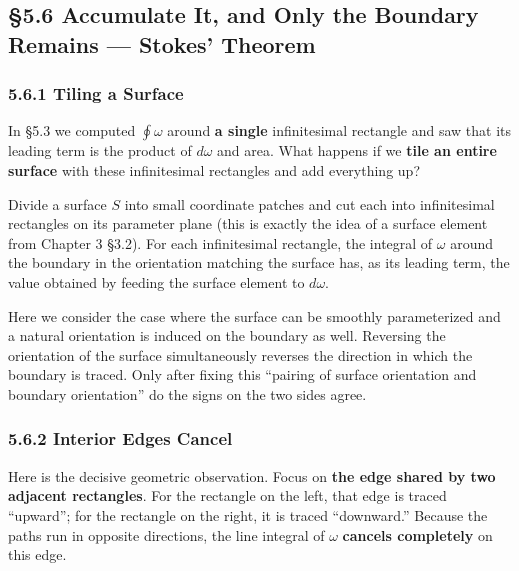 \documentclass[a4paper,12pt,openany]{book}
\begin{document}
\par\vspace{0.35em}\par

\hypertarget{accumulate-it-and-only-the-boundary-remains-stokes-theorem}{%
\subsection{§5.6 Accumulate It, and Only the Boundary Remains —
Stokes'
Theorem}\label{accumulate-it-and-only-the-boundary-remains-stokes-theorem}}

\hypertarget{tiling-a-surface}{%
\subsubsection{5.6.1 Tiling a Surface}\label{tiling-a-surface}}

In §5.3 we computed \(\oint \omega\) around \textbf{a single}
infinitesimal rectangle and saw that its leading term is the product of
\(d\omega\) and area. What happens if we \textbf{tile an entire surface}
with these infinitesimal rectangles and add everything up?

Divide a surface \(S\) into small coordinate patches and cut each into
infinitesimal rectangles on its parameter plane (this is exactly the
idea of a surface element from Chapter 3 §3.2). For each infinitesimal
rectangle, the integral of \(\omega\) around the boundary in the
orientation matching the surface has, as its leading term, the value
obtained by feeding the surface element to \(d\omega\).

Here we consider the case where the surface can be smoothly
parameterized and a natural orientation is induced on the boundary as
well. Reversing the orientation of the surface simultaneously reverses
the direction in which the boundary is traced. Only after fixing this
``pairing of surface orientation and boundary orientation'' do the signs
on the two sides agree.

\hypertarget{interior-edges-cancel}{%
\subsubsection{5.6.2 Interior Edges
Cancel}\label{interior-edges-cancel}}

Here is the decisive geometric observation. Focus on
\textbf{the edge shared by two adjacent rectangles}. For the rectangle
on the left, that edge is traced ``upward''; for the rectangle on the
right, it is traced ``downward.'' Because the paths run in opposite
directions, the line integral of \(\omega\) \textbf{cancels completely}
on this edge.
\end{document}
